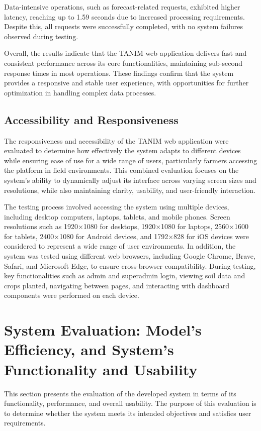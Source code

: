 {	Data-intensive operations, such as forecast-related requests, exhibited higher latency, reaching up to 1.59 seconds due to increased processing requirements. Despite this, all requests were successfully completed, with no system failures observed during testing.
	
	Overall, the results indicate that the TANIM web application delivers fast and consistent performance across its core functionalities, maintaining sub-second response times in most operations. These findings confirm that the system provides a responsive and stable user experience, with opportunities for further optimization in handling complex data processes.
	
	\subsection{Accessibility and Responsiveness}
	
	The responsiveness and accessibility of the TANIM web application were evaluated to determine how effectively the system adapts to different devices while ensuring ease of use for a wide range of users, particularly farmers accessing the platform in field environments. This combined evaluation focuses on the system's ability to dynamically adjust its interface across varying screen sizes and resolutions, while also maintaining clarity, usability, and user-friendly interaction.
	
	The testing process involved accessing the system using multiple devices, including desktop computers, laptops, tablets, and mobile phones. Screen resolutions such as 1920×1080 for desktops, 1920×1080 for laptops, 2560×1600 for tablets, 2400×1080 for Android devices, and 1792×828 for iOS devices were considered to represent a wide range of user environments. In addition, the system was tested using different web browsers, including Google Chrome, Brave, Safari, and Microsoft Edge, to ensure cross-browser compatibility. During testing, key functionalities such as admin and superadmin login, viewing soil data and crops planted, navigating between pages, and interacting with dashboard components were performed on each device.
	
	
	\section{System Evaluation: Model's Efficiency, and System's Functionality and Usability}
	
	This section presents the evaluation of the developed system in terms of its functionality, performance, and overall usability. The purpose of this evaluation is to determine whether the system meets its intended objectives and satisfies user requirements.
	
}
